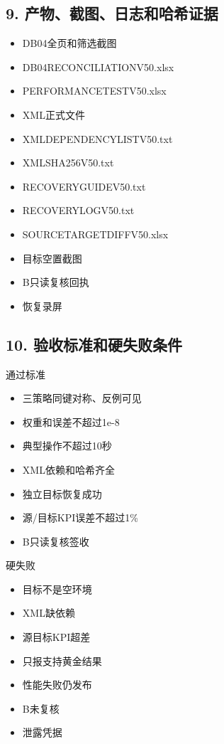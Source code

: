 \documentclass[UTF8,openany,zihao=-4]{ctexbook}
\renewcommand{\_}{\textunderscore\allowbreak}
\begin{document}
\subsection*{9. 产物、截图、日志和哈希证据}
\begin{itemize}[label=$\square$]
\item DB04全页和筛选截图
\item DB04\_RECONCILIATION\_V50.xlsx
\item PERFORMANCE\_TEST\_V50.xlsx
\item XML正式文件
\item XML\_DEPENDENCY\_LIST\_V50.txt
\item XML\_SHA256\_V50.txt
\item RECOVERY\_GUIDE\_V50.txt
\item RECOVERY\_LOG\_V50.txt
\item SOURCE\_TARGET\_DIFF\_V50.xlsx
\item 目标空置截图
\item B只读复核回执
\item 恢复录屏
\end{itemize}

\subsection*{10. 验收标准和硬失败条件}
\begin{statusbox}{通过标准}
\begin{itemize}[label=$\square$]
\item 三策略同键对称、反例可见
\item 权重和误差不超过1e-8
\item 典型操作不超过10秒
\item XML依赖和哈希齐全
\item 独立目标恢复成功
\item 源/目标KPI误差不超过1\%
\item B只读复核签收
\end{itemize}
\end{statusbox}
\begin{dangerbox}{硬失败}
\begin{itemize}
\item 目标不是空环境
\item XML缺依赖
\item 源目标KPI超差
\item 只报支持黄金结果
\item 性能失败仍发布
\item B未复核
\item 泄露凭据
\end{itemize}
\end{dangerbox}
\end{document}
